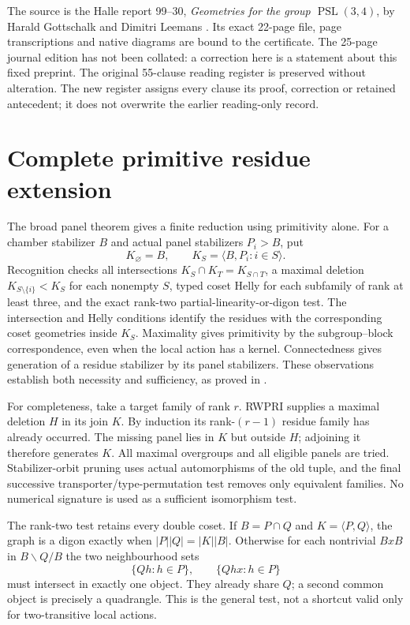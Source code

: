 \documentclass[11pt]{article}
\newcommand{\PSL}{\operatorname{PSL}}\newcommand{\PG}{\operatorname{PG}}
\begin{document}
The source is the Halle report 99--30, \emph{Geometries for the group
$\PSL(3,4)$}, by Harald Gottschalk and Dimitri Leemans \cite{GL}.
Its exact 22-page file, page transcriptions and native diagrams are
bound to the certificate. The 25-page journal edition has not been
collated: a correction here is a statement about this fixed preprint.
The original 55-clause reading register is preserved without alteration.
The new register assigns every clause its proof, correction or retained
antecedent; it does not overwrite the earlier reading-only record.

\section{Complete primitive residue extension}\label{exhaust}
The broad panel theorem \cite{Panel} gives a finite reduction using
primitivity alone. For a chamber stabilizer $B$ and actual panel
stabilizers $P_i>B$, put
\[
 K_\varnothing=B,\qquad K_S=\langle B,P_i:i\in S\rangle.
\]
Recognition checks all intersections
$K_S\cap K_T=K_{S\cap T}$, a maximal deletion
$K_{S\setminus\{i\}}<K_S$ for each nonempty $S$, typed coset Helly
for each subfamily of rank at least three, and the exact rank-two
partial-linearity-or-digon test. The intersection and Helly conditions
identify the residues with the corresponding coset geometries inside
$K_S$. Maximality gives primitivity by the subgroup--block correspondence,
even when the local action has a kernel. Connectedness gives generation
of a residue stabilizer by its panel stabilizers. These observations
establish both necessity and sufficiency, as proved in \cite{Panel}.

For completeness, take a target family of rank $r$. RWPRI supplies a
maximal deletion $H$ in its join $K$. By induction its rank-$(r-1)$
residue family has already occurred. The missing panel lies in $K$
but outside $H$; adjoining it therefore generates $K$. All maximal
overgroups and all eligible panels are tried. Stabilizer-orbit pruning
uses actual automorphisms of the old tuple, and the final successive
transporter/type-permutation test removes only equivalent families.
No numerical signature is used as a sufficient isomorphism test.

The rank-two test retains every double coset. If $B=P\cap Q$ and
$K=\langle P,Q\rangle$, the graph is a digon exactly when
$|P||Q|=|K||B|$. Otherwise for each nontrivial $BxB$ in $B\backslash Q/B$
the two neighbourhood sets
\[
 \{Qh:h\in P\},\qquad \{Qhx:h\in P\}
\]
must intersect in exactly one object. They already share $Q$; a second
common object is precisely a quadrangle. This is the general test,
not a shortcut valid only for two-transitive local actions.
\end{document}
